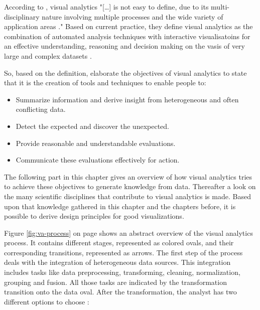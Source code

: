 According to \citeauthor{Keim2010}, visual analytics "[\ldots] is not easy to define, due to its multi-disciplinary nature involving multiple processes and the wide variety of application areas ." Based on current practice, they define visual analytics as the combination of automated analysis techniques with interactive visualisatoins for an effective understanding, reasoning and decision making on the vasis of very large and complex datasets .

So, based on the definition, \citeauthor{Keim2010} elaborate the objectives of visual analytics to state that it is the creation of tools and techniques to enable people to:

\begin{itemize}
\item Summarize information and derive insight from heterogeneous and often conflicting data.
\item Detect the expected and discover the unexpected.
\item Provide reasonable and understandable evaluations.
\item Communicate these evaluations effectively for action.
\end{itemize}

The following part in this chapter gives an overview of how visual analytics tries to achieve these objectives to generate knowledge from data. Thereafter a look on the many scientific disciplines that contribute to visual analytics is made.
Based upon that knowledge gathered in this chapter and the chapters before, it is possible to derive design principles for good visualizations.

Figure \ref{fig:va-process} on page \pageref{fig:va-process} shows an abstract overview of the visual analytics process. It contains different stages, represented as colored ovals, and their corresponding transitions, represented as arrows. The first step of the process deals with the integration of heterogeneous data sources. This integration includes tasks like data preprocessing, transforming, cleaning, normalization, grouping and fusion. All those tasks are indicated by the transformation transition onto the data oval. After the transformation, the analyst has two different options to choose :

